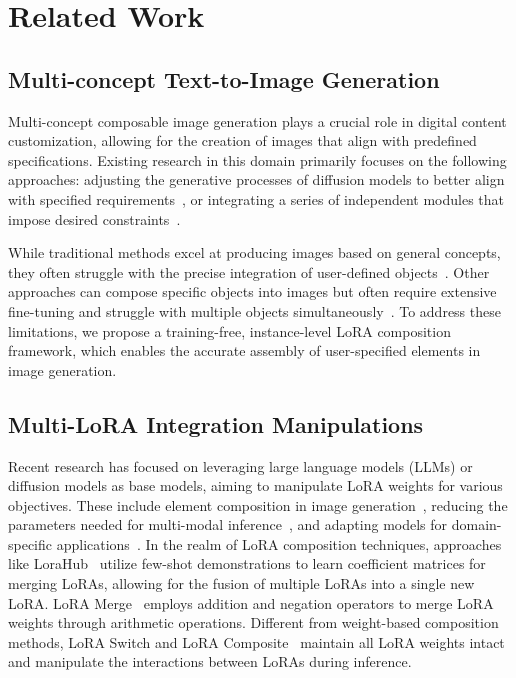 \vspace{-5pt}
\section{Related Work}
\vspace{-6pt}
\subsection{Multi-concept Text-to-Image Generation}
\vspace{-8pt}
Multi-concept composable image generation plays a crucial role in digital content customization, allowing for the creation of images that align with predefined specifications. Existing research in this domain primarily focuses on the following approaches: adjusting the generative processes of diffusion models to better align with specified requirements~\citep{multi1, multi2, multi5, multi6}, or integrating a series of independent modules that impose desired constraints~\citep{multi3, mixlora, multilora}.

While traditional methods excel at producing images based on general concepts, they often struggle with the precise integration of user-defined objects~\citep{multi2, multi4}. Other approaches can compose specific objects into images but often require extensive fine-tuning and struggle with multiple objects simultaneously~\citep{lorahub,ziplora}. To address these limitations, we propose a training-free, instance-level LoRA composition framework, which enables the accurate assembly of user-specified elements in image generation.
\vspace{-7pt}
\subsection{Multi-LoRA Integration Manipulations}
\vspace{-6pt}
Recent research has focused on leveraging large language models (LLMs) or diffusion models as base models, aiming to manipulate LoRA weights for various objectives. These include element composition in image generation~\citep{loracomposer, ziplora}, reducing the parameters needed for multi-modal inference~\citep{loraeff1, loraeff2}, and adapting models for domain-specific applications~\citep{llmlora1, llmlora2, loraadapt1}. In the realm of LoRA composition techniques, approaches like LoraHub~\citep{lorahub} utilize few-shot demonstrations to learn coefficient matrices for merging LoRAs, allowing for the fusion of multiple LoRAs into a single new LoRA. LoRA Merge~\citep{loramerge} employs addition and negation operators to merge LoRA weights through arithmetic operations. Different from weight-based composition methods, LoRA Switch and LoRA Composite~\citep{multilora} maintain all LoRA weights intact and manipulate the interactions between LoRAs during inference.

